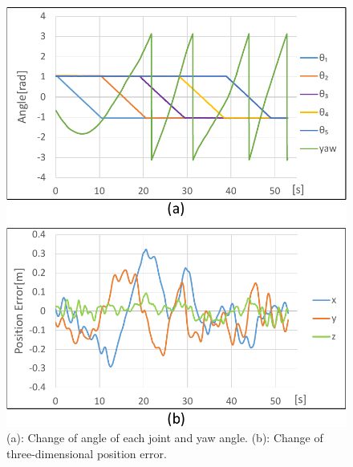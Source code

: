 \begin{figure}[th]
  \begin{center}
    \includegraphics[width=1.0\columnwidth]{figs/transform_result.pdf}
  \end{center}
  \caption{(a): Change of angle of each joint and yaw angle. (b): Change of three-dimensional position error. \label{figure:transform_result}}
\end{figure}


